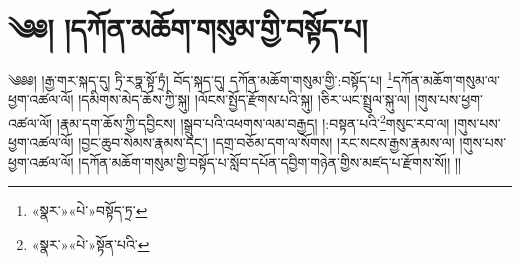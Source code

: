 \chapter{༄༅། །དཀོན་མཆོག་གསུམ་གྱི་བསྟོད་པ།}༄༅༅། །རྒྱ་གར་སྐད་དུ། ཏྲི་རཏྣ་སྟོ་ཏྲཾ། བོད་སྐད་དུ། དཀོན་མཆོག་གསུམ་གྱི་:བསྟོད་པ། \footnote{«སྣར་»«པེ་»བསྟོད་ཏྲ་}དཀོན་མཆོག་གསུམ་ལ་ཕྱག་འཚལ་ལོ། །དམིགས་མེད་ཆོས་ཀྱི་སྐུ། །ལོངས་སྤྱོད་རྫོགས་པའི་སྐུ། །ཅིར་ཡང་སྤྲུལ་སྐུ་ལ། །གུས་པས་ཕྱག་འཚལ་ལོ། །རྣམ་དག་ཆོས་ཀྱི་དབྱིངས། །སྒྲུབ་པའི་འཕགས་ལམ་བརྒྱད། །:བསྟན་པའི་\footnote{«སྣར་»«པེ་»སྟོན་པའི་}གསུང་རབ་ལ། །གུས་པས་ཕྱག་འཚལ་ལོ། །བྱང་ཆུབ་སེམས་རྣམས་དང་། །དགྲ་བཅོམ་དག་ལ་སོགས། །རང་སངས་རྒྱས་རྣམས་ལ། །གུས་པས་ཕྱག་འཚལ་ལོ། །དཀོན་མཆོག་གསུམ་གྱི་བསྟོད་པ་སློབ་དཔོན་དབྱིག་གཉེན་གྱིས་མཛད་པ་རྫོགས་སོ།། །།